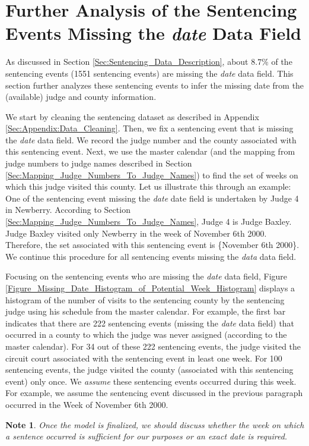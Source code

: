 \documentclass[11pt, oneside]{article}   	%
\theoremstyle{ModifiedStyle}
\newtheorem{note}{Note}
\begin{document}
\clearpage

\section{Further Analysis of the Sentencing Events Missing the \emph{date} Data Field}
\label{Sec:Appendix:Missing_Dates}
As discussed in Section \ref{Sec:Sentencing_Data_Description}, about $8.7\%$ of the sentencing events (1551 sentencing events) are missing the \emph{date} data field. This section further analyzes these sentencing events to infer the missing date from the (available) judge and county information.

We start by cleaning the sentencing dataset as described in Appendix \ref{Sec:Appendix:Data_Cleaning}. Then, we fix a sentencing event that is missing the \emph{date} data field. We record the judge number and the county associated with this sentencing event. Next, we use the master calendar (and the mapping from judge numbers to judge names described in Section \ref{Sec:Mapping_Judge_Numbers_To_Judge_Names}) to find the set of weeks on which this judge visited this county. Let us illustrate this through an example: One of the sentencing event missing the \emph{date} date field is undertaken by Judge 4 in Newberry. According to Section \ref{Sec:Mapping_Judge_Numbers_To_Judge_Names}, Judge 4 is Judge Baxley. Judge Baxley visited only Newberry in the week of November 6th 2000. Therefore, the set associated with this sentencing event is \{November 6th 2000\}. We continue this procedure for all sentencing events missing the \emph{data} data field.

Focusing on the sentencing events who are missing the \emph{date} data field, Figure \ref{Figure_Missing_Date_Histogram_of_Potential_Week_Histogram} displays a histogram of the number of visits to the sentencing county by the sentencing judge using his schedule from the master calendar. For example, the first bar indicates that there are 222 sentencing events (missing the \emph{date} data field) that occurred in a county to which the judge was never assigned (according to the master calendar). For 34 out of these 222 sentencing events, the judge visited the circuit court associated with the sentencing event in least one week. For 100 sentencing events, the judge visited the county (associated with this sentencing event) only once. We \emph{assume} these sentencing events occurred during this week. For example, we assume the sentencing event discussed in the previous paragraph occurred in the Week of November 6th 2000.
%
\begin{note}
	Once the model is finalized, we should discuss whether the week on which a sentence occurred is sufficient for our purposes or an exact date is required.
\end{note}
\end{document}
